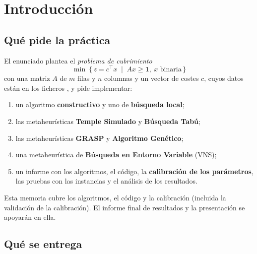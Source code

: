 \section{Introducción}

\subsection{Qué pide la práctica}

El enunciado plantea el \emph{problema de cubrimiento}
\[
  \min\ \{\, z = c^{\top}x \;\mid\; Ax \ge \mathbf{1},\ x \text{ binaria} \,\}
\]
con una matriz $A$ de $m$ filas y $n$ columnas y un vector de costes $c$, cuyos datos están
en los ficheros , y pide implementar:
\begin{enumerate}
  \item un algoritmo \textbf{constructivo} y uno de \textbf{búsqueda local};
  \item las metaheurísticas \textbf{Temple Simulado} y \textbf{Búsqueda Tabú};
  \item las metaheurísticas \textbf{GRASP} y \textbf{Algoritmo Genético};
  \item una metaheurística de \textbf{Búsqueda en Entorno Variable} (VNS);
  \item un informe con los algoritmos, el código, la \textbf{calibración de los parámetros},
        las pruebas con las instancias y el análisis de los resultados.
\end{enumerate}

Esta memoria cubre los algoritmos, el código y la calibración (incluida la validación de la
calibración). El informe final de resultados y la presentación se apoyarán en ella.

\subsection{Qué se entrega}

